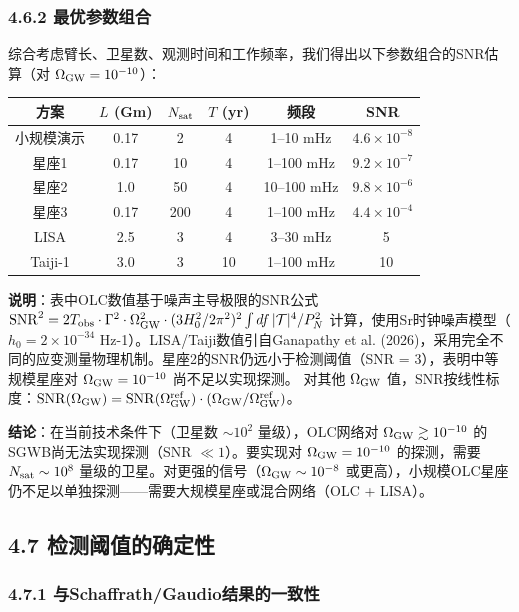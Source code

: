 \documentclass[12pt,a4paper]{article}
\begin{document}
\subsubsection{4.6.2 最优参数组合}


综合考虑臂长、卫星数、观测时间和工作频率，我们得出以下参数组合的SNR估算（对 $\Omega_{\rm GW} = 10^{-10}$）：

\begin{tabular}{|c|c|c|c|c|c|}
\hline
方案 & $L$ (Gm) & $N_{\rm sat}$ & $T$ (yr) & 频段 & SNR \\
\hline
小规模演示 & 0.17 & 2 & 4 & 1–10 mHz & $4.6 \times 10^{-8}$ \\
星座1 & 0.17 & 10 & 4 & 1–100 mHz & $9.2 \times 10^{-7}$ \\
星座2 & 1.0 & 50 & 4 & 10–100 mHz & $9.8 \times 10^{-6}$ \\
星座3 & 0.17 & 200 & 4 & 1–100 mHz & $4.4 \times 10^{-4}$ \\
LISA & 2.5 & 3 & 4 & 3–30 mHz & ~5 \\
Taiji-1 & 3.0 & 3 & 10 & 1–100 mHz & ~10 \\
\hline
\end{tabular}


\textbf{说明}：表中OLC数值基于噪声主导极限的SNR公式 ${\rm SNR}^2 = 2 T_{\rm obs} \cdot \Gamma^2 \cdot \Omega_{\rm GW}^2 \cdot (3H_0^2/2\pi^2)^2 \int df\, |\mathcal{T}|^4/P_N^2$ 计算，使用Sr时钟噪声模型（$h_0 = 2\times 10^{-34}$ Hz-1）。LISA/Taiji数值引自Ganapathy et al. (2026)，采用完全不同的应变测量物理机制。星座2的SNR仍远小于检测阈值（SNR = 3），表明中等规模星座对 $\Omega_{\rm GW} = 10^{-10}$ 尚不足以实现探测。
对其他 $\Omega_{\rm GW}$ 值，SNR按线性标度：${\rm SNR}(\Omega_{\rm GW}) = {\rm SNR}(\Omega_{\rm GW}^{\rm ref}) \cdot (\Omega_{\rm GW}/\Omega_{\rm GW}^{\rm ref})$。

\textbf{结论}：在当前技术条件下（卫星数 $\sim 10^2$ 量级），OLC网络对 $\Omega_{\rm GW} \gtrsim 10^{-10}$ 的SGWB尚无法实现探测（SNR $\ll 1$）。要实现对 $\Omega_{\rm GW} = 10^{-10}$ 的探测，需要 $N_{\rm sat} \sim 10^8$ 量级的卫星。对更强的信号（$\Omega_{\rm GW} \sim 10^{-8}$ 或更高），小规模OLC星座仍不足以单独探测——需要大规模星座或混合网络（OLC + LISA）。

\subsection{4.7 检测阈值的确定性}


\subsubsection{4.7.1 与Schaffrath/Gaudio结果的一致性}
\end{document}
